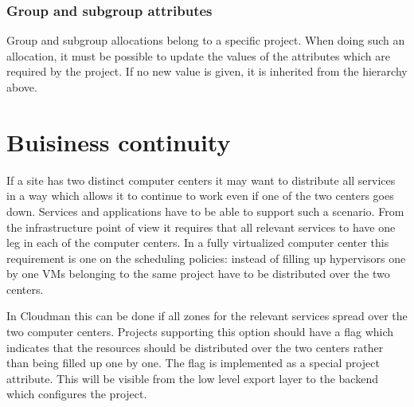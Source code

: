 \subsubsection{Group and subgroup attributes}
Group and subgroup allocations belong to a specific project. When doing such an allocation, it must be possible to update the values of the attributes which are required by the project. If no new value is given, it is inherited from the hierarchy above.  


\section{Buisiness continuity}
If a site has two distinct computer centers it may want to distribute all services in a way which allows it to continue to work even if one of the two centers goes down. Services and applications have to be able to support such a scenario. From the infrastructure point of view it requires that all relevant services to have one leg in each of the computer centers. 
In a fully virtualized computer center this requirement is one on the scheduling policies: instead of filling up hypervisors one by one VMs belonging to the same project have to be distributed over the two centers. 

In Cloudman this can be done if all zones for the relevant services spread over the two computer centers. Projects supporting this option should have a flag which indicates that the resources should be distributed over the two centers rather than being filled up one by one. The flag is implemented as a special project attribute. This will be visible from the low level export layer to the backend which configures the project. 



